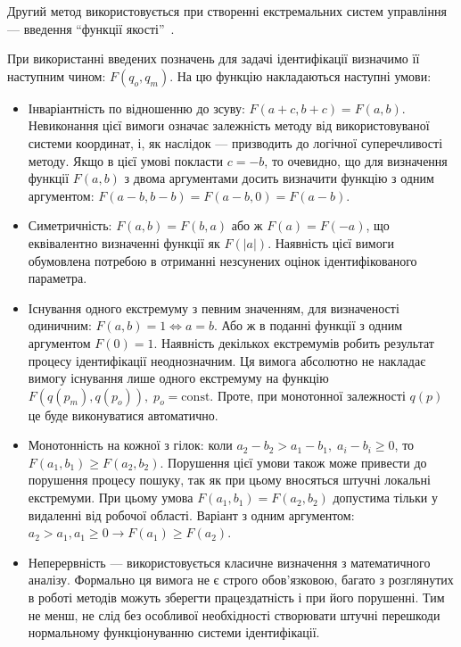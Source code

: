 Другий метод використовується при створенні екстремальних систем управління ---
введення ``функції якості''~\cite{eykhoff_modern_id,info_cipkin}.

При використанні введених позначень для задачі ідентифікації
визначимо її наступним чином:
\label{atu:d:F}$F(q_o, q_m)$.
На цю функцію накладаються наступні умови:

\begin{itemize}

  \item
    Інваріантність по відношенню до зсуву:
    $F(a+c,b+c) = F(a,b)$.
    Невиконання цієї вимоги означає залежність методу від
    використовуваної системи координат, і, як наслідок --- призводить
    до логічної суперечливості методу. Якщо в цієї умові покласти
    $ c = -b $, то очевидно, що для визначення функції
    $ F (a, b) $ з двома аргументами досить визначити функцію з одним
    аргументом: $ F (a-b, b-b) = F (a-b, 0 ) = F (a-b) $.

  \item
    Симетричність:
    $ F (a, b) = F (b, a) $ або ж
    $F (a) = F (-a) $, що еквівалентно визначенні функції як
    $F(|a|) $. Наявність цієї вимоги обумовлена потребою в отриманні
    незсунених оцінок ідентифікованого параметра.

  \item
    Існування одного екстремуму
    з певним значенням, для визначеності одиничним:
    $F(a,b) = 1  \Leftrightarrow a = b $.
    Або ж в поданні функції з одним аргументом
    $ F (0) = 1 $. Наявність декількох екстремумів робить результат
    процесу ідентифікації неоднозначним. Ця вимога абсолютно не
    накладає вимогу існування лише одного екстремуму на функцію
    $ F (q (p_m), q (p_o)), \; p_o = \mathrm{const} $. Проте, при монотонної залежності
    $q(p)$ це буде виконуватися автоматично.

  \item
    Монотонність на кожної з гілок:
    коли $ a_2-b_2 > a_1-b_1, \; a_i-b_i \ge 0$, то $F(a_1,b_1) \ge F(a_2,b_2)$.
    Порушення цієї умови також може привести до порушення
    процесу пошуку, так як при цьому вносяться штучні локальні
    екстремуми. При цьому умова
    $ F (a_1, b_1) = F (a_2, b_2) $ допустима тільки у видаленні від робочої
    області. Варіант з одним аргументом:
    $ a_2 > a_1, a_1 \ge 0 \to F(a_1) \ge F(a_2)$.

  \item
    Неперервність ---
    використовується класичне визначення з математичного
    аналізу. Формально ця вимога не є строго обов'язковою, багато з
    розглянутих в роботі методів можуть зберегти працездатність
    і при його порушенні. Тим не менш, не слід без особливої
    необхідності створювати штучні перешкоди нормальному
    функціонуванню системи ідентифікації.

\end{itemize}

